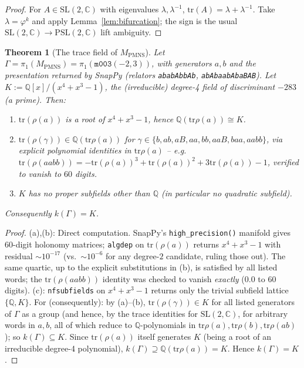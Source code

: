 \documentclass[12pt]{article}
\newtheorem{theorem}{Theorem}
\theoremstyle{definition}
\newcommand{\Q}{\mathbb{Q}}
\newcommand{\C}{\mathbb{C}}
\newcommand{\ph}{\varphi}
\newcommand{\tr}{\mathrm{tr}}
\begin{document}
\begin{proof}
For $A\in\mathrm{SL}(2,\C)$ with eigenvalues $\lambda,\lambda^{-1}$,
$\tr(A)=\lambda+\lambda^{-1}$. Take $\lambda=\ph^k$ and apply
Lemma~\ref{lem:bifurcation}; the sign is the usual
$\mathrm{SL}(2,\C)\to\mathrm{PSL}(2,\C)$ lift ambiguity.
\end{proof}

\begin{theorem}[The trace field of $M_{\mathrm{PMNS}}$]
\label{thm:kgamma}
Let $\Gamma=\pi_1(M_{\mathrm{PMNS}})=\pi_1(\texttt{m003}(-2,3))$, with
generators $a,b$ and the presentation returned by SnapPy
(relators \texttt{ababAbbAb}, \texttt{abAbaabAbaBAB}). Let
$K:=\Q[x]/(x^4+x^3-1)$, the (irreducible) degree-4 field of
discriminant $-283$ (a prime). Then:
\begin{enumerate}
\item[(a)] $\tr(\rho(a))$ is a root of $x^4+x^3-1$, hence
$\Q(\tr\rho(a))\cong K$.
\item[(b)] $\tr(\rho(\gamma))\in\Q(\tr\rho(a))$ for
$\gamma\in\{b,ab,aB,aa,bb,aaB,baa,aabb\}$, via explicit polynomial
identities in $\tr\rho(a)$ -- e.g.\
$\tr(\rho(aabb))=-\tr(\rho(a))^3+\tr(\rho(a))^2+3\tr(\rho(a))-1$,
verified to vanish to $60$ digits.
\item[(c)] $K$ has no proper subfields other than $\Q$ (in
particular no quadratic subfield).
\end{enumerate}
Consequently $k(\Gamma)=K$.
\end{theorem}

\begin{proof}
(a),(b): Direct computation. SnapPy's \texttt{high\_precision()}
manifold gives $60$-digit holonomy matrices; \texttt{algdep} on
$\tr(\rho(a))$ returns $x^4+x^3-1$ with residual $\sim10^{-17}$ (vs.\
$\sim10^{-6}$ for any degree-$2$ candidate, ruling those out). The same
quartic, up to the explicit substitutions in (b), is satisfied by all
listed words; the $\tr(\rho(aabb))$ identity was checked to vanish
\emph{exactly} ($0.0$ to $60$ digits). (c): \texttt{nfsubfields} on
$x^4+x^3-1$ returns only the trivial subfield lattice $\{\Q,K\}$. For
(consequently): by (a)--(b), $\tr(\rho(\gamma))\in K$ for all listed
generators of $\Gamma$ as a group (and hence, by the trace identities
for $\mathrm{SL}(2,\C)$, for arbitrary words in $a,b$, all of which
reduce to $\Q$-polynomials in $\tr\rho(a),\tr\rho(b),\tr\rho(ab)$); so
$k(\Gamma)\subseteq K$. Since $\tr(\rho(a))$ itself generates $K$
(being a root of an irreducible degree-4 polynomial), $k(\Gamma)\supseteq
\Q(\tr\rho(a))=K$. Hence $k(\Gamma)=K$.
\end{proof}
\end{document}
